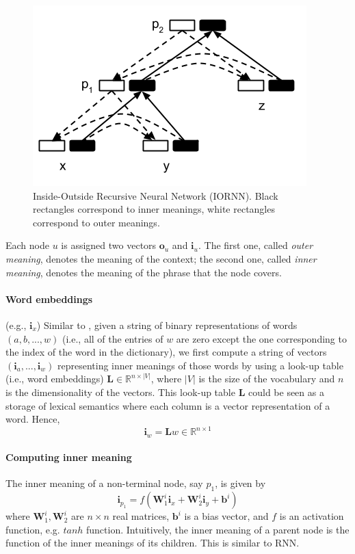 \documentclass[11pt]{article}
\begin{document}
\begin{figure}[h!]
	\center
	\includegraphics[scale=0.5]{IORNN.png}
	\caption{Inside-Outside Recursive Neural Network (IORNN). 
	Black rectangles correspond to inner meanings, 
	white rectangles correspond to outer meanings.}
	\label{figure iornn}
\end{figure}


Each node $u$ is assigned two vectors $\mathbf{o}_u$ and $\mathbf{i}_u$. The first one,
called \textit{outer meaning}, denotes the meaning of the context; the second one, 
called \textit{inner meaning}, denotes the meaning of the phrase that the node covers.

\paragraph{Word embeddings} (e.g., $\mathbf{i}_x$)
Similar to , given a string of binary
representations of words $(a, b, ..., w)$ (i.e., all of the entries of $w$ are zero except the one 
corresponding to the index of the word in the dictionary), 
we first compute a string of vectors $(\mathbf{i}_{a},...,\mathbf{i}_{w})$ 
representing inner meanings of those words by using 
a look-up table (i.e., word embeddings) $\mathbf{L} \in \mathbb{R}^{n \times |V|}$, 
where $|V|$ is the size of the vocabulary and $n$ is the dimensionality of the vectors. 
This look-up table $\mathbf{L}$ could be seen as a storage of lexical semantics where each column 
is a vector representation of a word. Hence, 
\begin{equation}
    \label{equation compute word vector}
    \mathbf{i}_{w} = \mathbf{L} w \in \mathbb{R}^{n \times 1}
\end{equation}

\paragraph{Computing inner meaning} The inner meaning of a non-terminal node, say $p_1$, is given by
\begin{equation}
	\mathbf{i}_{p_1} = f(\mathbf{W}_1^i \mathbf{i}_{x} + \mathbf{W}_2^i \mathbf{i}_{y} + \mathbf{b}^i)
	\label{equation inner}
\end{equation}
where $\mathbf{W}_1^i, \mathbf{W}_2^i$ are $n \times n$ real matrices, 
$\mathbf{b}^i$ is a bias vector, and $f$ is an activation function, e.g. $tanh$ 
function. Intuitively, the inner meaning of a parent node is the function of the inner meanings 
of its children. This is similar to RNN.
\end{document}
